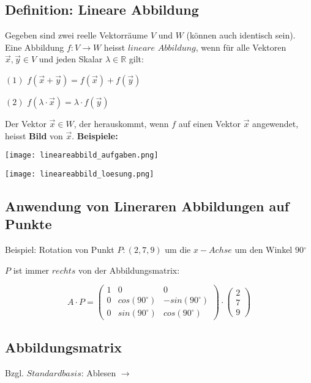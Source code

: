 \begin{multicols*}{3}
    \subsection{Definition: Lineare Abbildung}
    { Gegeben sind zwei reelle Vektorräume $V$ und $W$ (können auch identisch sein).}
    {Eine Abbildung $f:V \rightarrow W$ heisst $lineare$ $Abbildung$, wenn für alle Vektoren $\vec{x},\vec{y} \in  V$ und jeden Skalar $\lambda \in \mathbb{R} $ gilt:}

    {$(1)$ $f(\vec{x}+\vec{y})=f(\vec{x}) + f(\vec{y})$}

    {$(2)$ $f(\lambda \cdot \vec{x})=\lambda \cdot f(\vec{y})$}
    \WhiteSpace

    {Der Vektor $\vec{x} \in W$, der herauskommt, wenn $f$ auf einen Vektor $\vec{x}$ angewendet, heisst \textbf{Bild} von $\vec{x}$.}
    \WhiteSpace
    {\textbf{Beispiele:}}

    {\texttt{[image: lineareabbild\_aufgaben.png]}}

    {\texttt{[image: lineareabbild\_loesung.png]}}

    \subsection{Anwendung von Lineraren Abbildungen auf Punkte}
    {Beispiel: Rotation von Punkt $P:(2,7,9)$ um die $x-Achse$ um den Winkel $90$$^{\circ}$}

    {$P$ ist immer $rechts$ von der Abbildungsmatrix:}



    $$A \cdot P = \begin{pmatrix}
            1 & 0               & 0                \\
            0 & cos(90^{\circ}) & -sin(90^{\circ}) \\
            0 & sin(90^{\circ}) & cos(90^{\circ})
        \end{pmatrix} \cdot \begin{pmatrix}
            2 \\
            7 \\
            9
        \end{pmatrix}$$

    \vfill\null
    \columnbreak
    \subsection{Abbildungsmatrix}
    {Bzgl. $Standardbasis$: Ablesen $\to$}


\end{multicols*}
